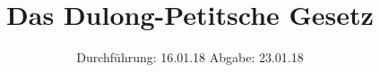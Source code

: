 

\subject{V201}
\title{Das Dulong-Petitsche Gesetz}
\date{
  Durchführung: 16.01.18
  \hspace{3em}
  Abgabe: 23.01.18
}



\maketitle
\thispagestyle{empty}
\tableofcontents
\newpage








\newpage
\printbibliography


